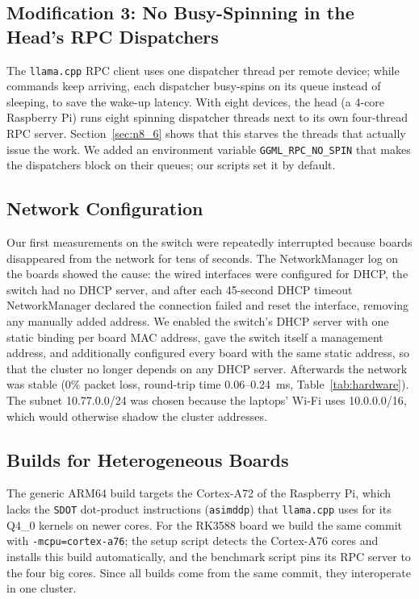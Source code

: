 \documentclass[11pt,a4paper]{article}
\begin{document}
\subsection{Modification 3: No Busy-Spinning in the Head's RPC Dispatchers}\label{sec:nospin}

The \texttt{llama.cpp} RPC client uses one dispatcher thread per remote device; while commands keep arriving, each dispatcher busy-spins on its queue instead of sleeping, to save the wake-up latency. With eight devices, the head (a 4-core Raspberry Pi) runs eight spinning dispatcher threads next to its own four-thread RPC server. Section~\ref{sec:n8_6} shows that this starves the threads that actually issue the work. We added an environment variable \texttt{GGML\_RPC\_NO\_SPIN} that makes the dispatchers block on their queues; our scripts set it by default.

\subsection{Network Configuration}\label{sec:n7_12}

Our first measurements on the switch were repeatedly interrupted because boards disappeared from the network for tens of seconds. The NetworkManager log on the boards showed the cause: the wired interfaces were configured for DHCP, the switch had no DHCP server, and after each 45-second DHCP timeout NetworkManager declared the connection failed and reset the interface, removing any manually added address. We enabled the switch's DHCP server with one static binding per board MAC address, gave the switch itself a management address, and additionally configured every board with the same static address, so that the cluster no longer depends on any DHCP server. Afterwards the network was stable (0\% packet loss, round-trip time 0.06--0.24~ms, Table~\ref{tab:hardware}). The subnet 10.77.0.0/24 was chosen because the laptops' Wi-Fi uses 10.0.0.0/16, which would otherwise shadow the cluster addresses.

\subsection{Builds for Heterogeneous Boards}\label{sec:n7_13}

The generic ARM64 build targets the Cortex-A72 of the Raspberry Pi, which lacks the \texttt{SDOT} dot-product instructions (\texttt{asimddp}) that \texttt{llama.cpp} uses for its Q4\_0 kernels on newer cores. For the RK3588 board we build the same commit with \texttt{-mcpu=cortex-a76}; the setup script detects the Cortex-A76 cores and installs this build automatically, and the benchmark script pins its RPC server to the four big cores. Since all builds come from the same commit, they interoperate in one cluster.
\end{document}
